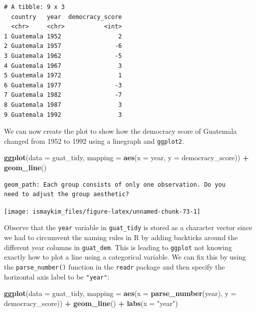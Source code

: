 \documentclass[12pt,]{krantz}
\makeatletter
\newenvironment{Shaded}{\begin{snugshade}}{\end{snugshade}}
\newcommand{\KeywordTok}[1]{\textcolor[rgb]{0.27,0.27,0.27}{\textbf{#1}}}
\newcommand{\DataTypeTok}[1]{\textcolor[rgb]{0.27,0.27,0.27}{#1}}
\newcommand{\StringTok}[1]{\textcolor[rgb]{0.5,0.5,0.5}{#1}}
\newcommand{\OperatorTok}[1]{\textcolor[rgb]{0.43,0.43,0.43}{\textbf{#1}}}
\newcommand{\NormalTok}[1]{#1}
\newenvironment{kframe}{%
\medskip{}
\setlength{\fboxsep}{.8em}
 \def\at@end@of@kframe{}%
 \ifinner\ifhmode%
  \def\at@end@of@kframe{\end{minipage}}%
  \begin{minipage}{\columnwidth}%
 \fi\fi%
 \def\FrameCommand##1{\hskip\@totalleftmargin \hskip-\fboxsep
 \colorbox{shadecolor}{##1}\hskip-\fboxsep
     \hskip-\linewidth \hskip-\@totalleftmargin \hskip\columnwidth}%
 \MakeFramed {\advance\hsize-\width
   \@totalleftmargin\z@ \linewidth\hsize
   \@setminipage}}%
 {\par\unskip\endMakeFramed%
 \at@end@of@kframe}
\renewenvironment{Shaded}{\begin{kframe}}{\end{kframe}}
\makeatother
\begin{document}
\begin{verbatim}
# A tibble: 9 x 3
  country   year  democracy_score
  <chr>     <chr>           <int>
1 Guatemala 1952                2
2 Guatemala 1957               -6
3 Guatemala 1962               -5
4 Guatemala 1967                3
5 Guatemala 1972                1
6 Guatemala 1977               -3
7 Guatemala 1982               -7
8 Guatemala 1987                3
9 Guatemala 1992                3
\end{verbatim}

We can now create the plot to show how the democracy score of Guatemala
changed from 1952 to 1992 using a linegraph and \texttt{ggplot2}.

\begin{Shaded}
\begin{Highlighting}[]
\KeywordTok{ggplot}\NormalTok{(}\DataTypeTok{data =}\NormalTok{ guat_tidy, }
       \DataTypeTok{mapping =} \KeywordTok{aes}\NormalTok{(}\DataTypeTok{x =}\NormalTok{ year, }\DataTypeTok{y =}\NormalTok{ democracy_score)) }\OperatorTok{+}
\StringTok{  }\KeywordTok{geom_line}\NormalTok{()}
\end{Highlighting}
\end{Shaded}

\begin{verbatim}
geom_path: Each group consists of only one observation. Do you
need to adjust the group aesthetic?
\end{verbatim}

\begin{center}\texttt{[image: ismaykim\_files/figure-latex/unnamed-chunk-73-1]} \end{center}

Observe that the \texttt{year} variable in \texttt{guat\_tidy} is stored
as a character vector since we had to circumvent the naming rules in R
by adding backticks around the different year columns in
\texttt{guat\_dem}. This is leading to \texttt{ggplot} not knowing
exactly how to plot a line using a categorical variable. We can fix this
by using the \texttt{parse\_number()} function in the \texttt{readr}
package and then specify the horizontal axis label to be
\texttt{"year"}:

\begin{Shaded}
\begin{Highlighting}[]
\KeywordTok{ggplot}\NormalTok{(}\DataTypeTok{data =}\NormalTok{ guat_tidy, }
       \DataTypeTok{mapping =} \KeywordTok{aes}\NormalTok{(}\DataTypeTok{x =} \KeywordTok{parse_number}\NormalTok{(year), }
                     \DataTypeTok{y =}\NormalTok{ democracy_score)) }\OperatorTok{+}
\StringTok{  }\KeywordTok{geom_line}\NormalTok{() }\OperatorTok{+}
\StringTok{  }\KeywordTok{labs}\NormalTok{(}\DataTypeTok{x =} \StringTok{"year"}\NormalTok{)}
\end{Highlighting}
\end{Shaded}
\end{document}
